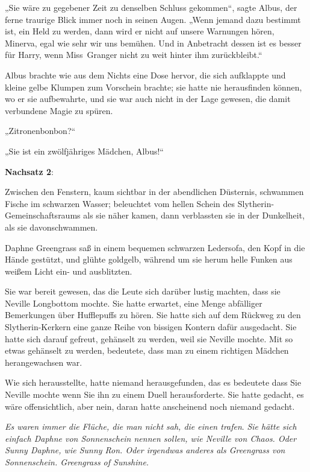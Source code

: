 {„Sie wäre zu gegebener Zeit zu denselben Schluss gekommen“, sagte Albus, der ferne traurige Blick immer noch in seinen Augen. „Wenn jemand dazu bestimmt ist, ein Held zu werden, dann wird er nicht auf unsere Warnungen hören, Minerva, egal wie sehr wir uns bemühen. Und in Anbetracht dessen ist es besser für Harry, wenn Miss~Granger nicht zu weit hinter ihm zurückbleibt.“

Albus brachte wie aus dem Nichts eine Dose hervor, die sich aufklappte und kleine gelbe Klumpen zum Vorschein brachte; sie hatte nie herausfinden können, wo er sie aufbewahrte, und sie war auch nicht in der Lage gewesen, die damit verbundene Magie zu spüren.

„Zitronenbonbon?“

„Sie ist ein zwölfjähriges Mädchen, Albus!“

\textbf{Nachsatz 2}:

Zwischen den Fenstern, kaum sichtbar in der abendlichen Düsternis, schwammen Fische im schwarzen Wasser; beleuchtet vom hellen Schein des Slytherin-Gemeinschaftsraums als sie näher kamen, dann verblassten sie in der Dunkelheit, als sie davonschwammen.

Daphne Greengrass saß in einem bequemen schwarzen Ledersofa, den Kopf in die Hände gestützt, und glühte goldgelb, während um sie herum helle Funken aus weißem Licht ein- und ausblitzten.

Sie war bereit gewesen, das die Leute sich darüber lustig machten, dass sie Neville Longbottom mochte. Sie hatte erwartet, eine Menge abfälliger Bemerkungen über Hufflepuffs zu hören. Sie hatte sich auf dem Rückweg zu den Slytherin-Kerkern eine ganze Reihe von bissigen Kontern dafür ausgedacht. Sie hatte sich darauf gefreut, gehänselt zu werden, weil sie Neville mochte. Mit so etwas gehänselt zu werden, bedeutete, dass man zu einem richtigen Mädchen herangewachsen war.

Wie sich herausstellte, hatte niemand herausgefunden, das es bedeutete dass Sie Neville mochte wenn Sie ihn zu einem Duell herausforderte. Sie hatte gedacht, es wäre offensichtlich, aber nein, daran hatte anscheinend noch niemand gedacht.

\emph{Es waren immer die Flüche, die man nicht sah, die einen trafen}. \emph{Sie hätte sich einfach Daphne von Sonnenschein nennen sollen, wie Neville von Chaos. Oder Sunny Daphne, wie Sunny Ron. Oder irgendwas anderes als Greengrass von Sonnenschein. Greengrass of Sunshine.}

}
